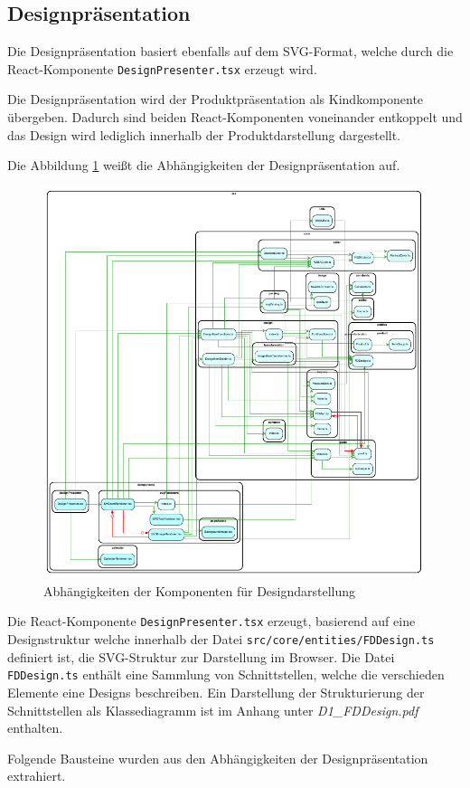 
\subsection{Designpräsentation}
Die Designpräsentation basiert ebenfalls auf dem SVG-Format, welche durch die React-Komponente \lstinline|DesignPresenter.tsx| erzeugt wird. 

Die Designpräsentation wird der Produktpräsentation als Kindkomponente übergeben. Dadurch sind beiden React-Komponenten voneinander entkoppelt und das Design wird lediglich innerhalb der Produktdarstellung dargestellt.

Die Abbildung \ref{fig:Designdarstellung} weißt die Abhängigkeiten der Designpräsentation auf.

\begin{figure}[H]
    \centering
    \includegraphics{diagrams/Ist-Architektur/design-presenter-analysis.pdf}
    \caption{Abhängigkeiten der Komponenten für Designdarstellung}
    \label{fig:Designdarstellung}
\end{figure}

Die React-Komponente \lstinline|DesignPresenter.tsx| erzeugt, basierend auf eine Designstruktur welche innerhalb der Datei \lstinline|src/core/entities/FDDesign.ts| definiert ist, die SVG-Struktur zur Darstellung im Browser. Die Datei \lstinline|FDDesign.ts| enthält eine Sammlung von Schnittstellen, welche die verschieden Elemente eine Designs beschreiben.   
Ein Darstellung der Strukturierung der Schnittstellen als Klassediagramm ist im Anhang unter \emph{D1\_FDDesign.pdf} enthalten.

Folgende Bausteine wurden aus den Abhängigkeiten der Designpräsentation extrahiert.
\begin{multicols}{2}

\end{multicols}